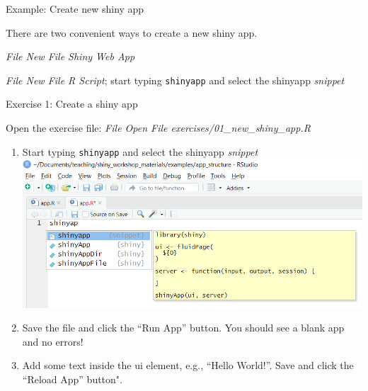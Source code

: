 \documentclass[
  12pt,
  ignorenonframetext,
]{beamer}
\providecommand{\tightlist}{%
  \setlength{\itemsep}{0pt}\setlength{\parskip}{0pt}}
\begin{document}
\begin{frame}[fragile]{Example: Create new shiny app}
\protect\hypertarget{example-create-new-shiny-app}{}

There are two convenient ways to create a new shiny app.

\begin{description}
\tightlist
\item[Option 1: Create a new shiny web app from example]
\emph{File \rightarrow New File \rightarrow Shiny Web App}
\item[Option 2: Create a new shiny app from a template]
\emph{File \rightarrow New File \rightarrow R Script}; start typing
\texttt{shinyapp} and select the shinyapp \emph{snippet}
\end{description}

\end{frame}

\begin{frame}[fragile]{Exercise 1: Create a shiny app}
\protect\hypertarget{exercise-1-create-a-shiny-app}{}

Open the exercise file: \emph{File \rightarrow Open File
\rightarrow exercises/01\_new\_shiny\_app.R}

\begin{enumerate}
\item
  Start typing \texttt{shinyapp} and select the shinyapp \emph{snippet}
  \includegraphics{./img/shiny_snippet.png}
\item
  Save the file and click the ``Run App'' button. You should see a blank
  app and no errors!
\item
  Add some text inside the ui element, e.g., ``Hello World!''. Save and
  click the ``Reload App'' button".
\end{enumerate}

\end{frame}
\end{document}
